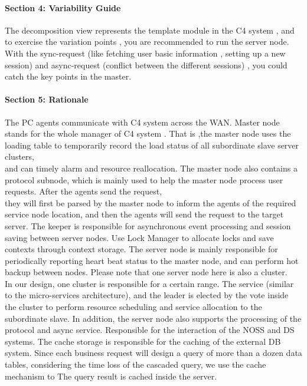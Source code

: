 \documentclass{article}
\begin{document}
			\paragraph{Section 4: Variability Guide}
			The decomposition view represents the template module in the C4 system , and to exercise the variation points , you are recommended to run the server node. With the sync-request (like fetching user basic information , setting up a new session)  and async-request (conflict between the different sessions) , you could catch the key points in the master.
			\paragraph{Section 5: Rationale}
			The PC agents communicate with C4 system across the WAN. 
			Master node stands for the whole manager of C4 system . That is ,the master node uses the loading table to temporarily record the load status of all subordinate slave server clusters, \\
			and can timely alarm and resource reallocation. The master node also contains a protocol subnode, which is mainly used to help the master node process user requests. After the agents send the request, \\
			they will first be parsed by the master node to inform the agents of the required service node location, and then the agents will send the request to the target server.	
			The keeper is responsible for asynchronous event processing and session saving between server nodes. Use Lock Manager to allocate locks and save contexts through context storage.
			The server node is mainly responsible for periodically reporting heart beat status to the master node, and can perform hot backup between nodes. Please note that one server node here is also a cluster.\\
			 In our design, one cluster is responsible for a certain range. The service (similar to the micro-services architecture), and the leader is elected by the vote inside the cluster to perform resource scheduling and service allocation to the subordinate slave. In addition, the server node also supports the processing of the protocol and async service. Responsible for the interaction of the NOSS and DS systems. The cache storage is responsible for the caching of the external DB system. Since each business request will design a query of more than a dozen data tables, considering the time loss of the cascaded query, we use the cache mechanism to The query result is cached inside the server.
\end{document}
